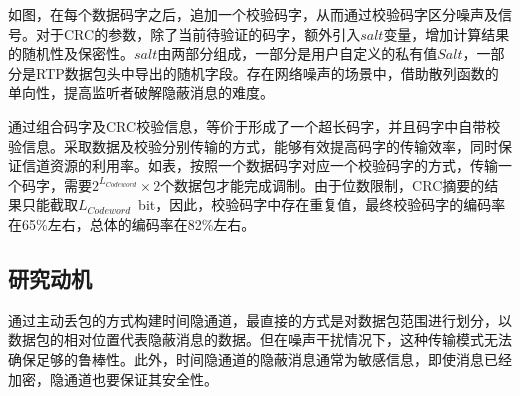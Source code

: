 如图，在每个数据码字之后，追加一个校验码字，从而通过校验码字区分噪声及信号。对于CRC的参数，除了当前待验证的码字，额外引入$salt$变量，增加计算结果的随机性及保密性。$salt$由两部分组成，一部分是用户自定义的私有值$Salt$，一部分是RTP数据包头中导出的随机字段。存在网络噪声的场景中，借助散列函数的单向性，提高监听者破解隐蔽消息的难度。


通过组合码字及CRC校验信息，等价于形成了一个超长码字，并且码字中自带校验信息。采取数据及校验分别传输的方式，能够有效提高码字的传输效率，同时保证信道资源的利用率。如表，按照一个数据码字对应一个校验码字的方式，传输一个码字，需要$2^{L_{Codeword}}\times 2$个数据包才能完成调制。由于位数限制，CRC摘要的结果只能截取{$L_{Codeword}$\ bit}，因此，校验码字中存在重复值，最终校验码字的编码率在65\%左右，总体的编码率在82\%左右。

\subsection{研究动机}
\label{chap:zigzag:motivation:conclude}
通过主动丢包的方式构建时间隐通道，最直接的方式是对数据包范围进行划分，以数据包的相对位置代表隐蔽消息的数据。但在噪声干扰情况下，这种传输模式无法确保足够的鲁棒性。此外，时间隐通道的隐蔽消息通常为敏感信息，即使消息已经加密，隐通道也要保证其安全性。

